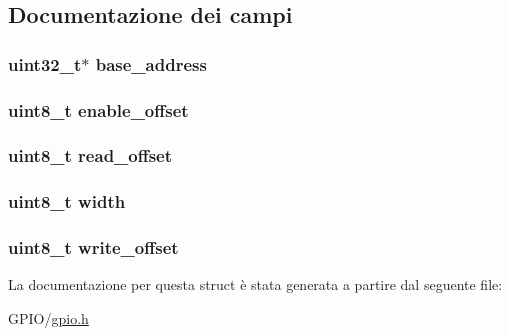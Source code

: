 \subsection{Documentazione dei campi}
\hypertarget{struct_g_p_i_o__t_a79c591d5fa42efdf86abd98347fece90}{
\subsubsection[{base\+\_\+address}]{\setlength{\rightskip}{0pt plus 5cm}uint32\+\_\+t$\ast$ base\+\_\+address}}\label{struct_g_p_i_o__t_a79c591d5fa42efdf86abd98347fece90}
\hypertarget{struct_g_p_i_o__t_a14886d03a6936e5edd25a9ad27af16bd}{
\subsubsection[{enable\+\_\+offset}]{\setlength{\rightskip}{0pt plus 5cm}uint8\+\_\+t enable\+\_\+offset}}\label{struct_g_p_i_o__t_a14886d03a6936e5edd25a9ad27af16bd}
\hypertarget{struct_g_p_i_o__t_ab65acde67dc46f1d163e2ee468420b48}{
\subsubsection[{read\+\_\+offset}]{\setlength{\rightskip}{0pt plus 5cm}uint8\+\_\+t read\+\_\+offset}}\label{struct_g_p_i_o__t_ab65acde67dc46f1d163e2ee468420b48}
\hypertarget{struct_g_p_i_o__t_a09a2a45f731b02946ff6d3cd15c1a476}{
\subsubsection[{width}]{\setlength{\rightskip}{0pt plus 5cm}uint8\+\_\+t width}}\label{struct_g_p_i_o__t_a09a2a45f731b02946ff6d3cd15c1a476}
\hypertarget{struct_g_p_i_o__t_abb65e5db6d4ad365a7c48d00e4af1f78}{
\subsubsection[{write\+\_\+offset}]{\setlength{\rightskip}{0pt plus 5cm}uint8\+\_\+t write\+\_\+offset}}\label{struct_g_p_i_o__t_abb65e5db6d4ad365a7c48d00e4af1f78}


La documentazione per questa struct è stata generata a partire dal seguente file\+:\begin{DoxyCompactItemize}
\item 
G\+P\+I\+O/\hyperlink{gpio_8h}{gpio.\+h}\end{DoxyCompactItemize}
